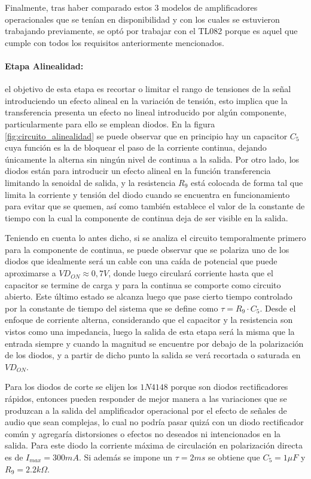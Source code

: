 Finalmente, tras haber comparado estos 3 modelos de amplificadores operacionales que se ten\'ian en disponibilidad y con los cuales se estuvieron trabajando previamente,
se opt\'o por trabajar con el TL082 porque es aquel que cumple con todos los requisitos anteriormente mencionados.

\paragraph*{Etapa Alinealidad:} el objetivo de esta etapa es recortar o limitar el rango de tensiones de la se\~nal introduciendo un efecto alineal en la variaci\'on de tensi\'on,
esto implica que la transferencia presenta un efecto no lineal introducido por alg\'un componente, particularmente para ello se emplean diodos. En la figura \ref{fig:circuito_alinealidad} se puede observar
que en principio hay un capacitor $C_5$ cuya funci\'on es la de bloquear el paso de la corriente continua, dejando \'unicamente la alterna sin ning\'un nivel de continua a la salida. Por otro lado, los diodos
est\'an para introducir un efecto alineal en la funci\'on transferencia limitando la senoidal de salida, y la resistencia $R_9$ est\'a colocada de forma tal que limita la corriente y tensi\'on del diodo
cuando se encuentra en funcionamiento para evitar que se quemen, as\'i como tambi\'en establece el valor de la constante de tiempo con la cual la componente de continua deja de ser visible en la salida.

Teniendo en cuenta lo antes dicho, si se analiza el circuito temporalmente primero para la componente de continua, se puede observar que se polariza uno de los diodos que idealmente ser\'a un cable con una ca\'ida de potencial
que puede aproximarse a $VD_{ON} \approx 0,7V$, donde luego circular\'a corriente hasta que el capacitor se termine de carga y para la continua se comporte como circuito abierto. Este \'ultimo estado se alcanza luego que pase cierto tiempo
controlado por la constante de tiempo del sistema que se define como $\tau = R_9 \cdot C_5$. Desde el enfoque de corriente alterna, considerando que el capacitor y la resistencia son vistos como una impedancia, luego la salida de esta 
etapa ser\'a la misma que la entrada siempre y cuando la magnitud se encuentre por debajo de la polarizaci\'on de los diodos, y a partir de dicho punto la salida se ver\'a recortada o saturada en $VD_{ON}$.

Para los diodos de corte se elijen los $1N4148$ porque son diodos rectificadores r\'apidos, entonces pueden responder de mejor manera a las variaciones que se produzcan a la salida del amplificador operacional por el efecto de 
se\~nales de audio que sean complejas, lo cual no podr\'ia pasar quiz\'a con un diodo rectificador com\'un y agregar\'ia distorsiones o efectos no deseados ni intencionados en la salida. Para este diodo la corriente m\'axima de circulaci\'on
en polarizaci\'on directa es de $I_{max} = 300mA$. Si adem\'as se impone un $\tau = 2ms$ se obtiene que $C_5 = 1\mu F$ y $R_9 = 2.2k\Omega$.

